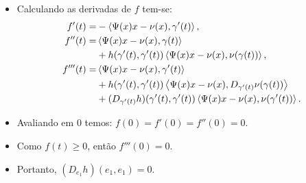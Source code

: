 \documentclass[10pt,a4paper]{beamer}
\theoremstyle{definition}
\begin{document}
\begin{frame}

	\begin{itemize}

		\item Calculando as derivadas de $f$ tem-se:
		\begin{align*}
		f'(t) =& -\left\langle \Psi(x)x - \nu(x),\gamma'(t) \right\rangle,\\
		f''(t) =& \left\langle \Psi(x)x - \nu(x),\gamma(t) \right\rangle\\
		& + h(\gamma'(t),\gamma'(t)) \left\langle \Psi(x)x - \nu(x),\nu(\gamma(t)) \right\rangle,\\
		f'''(t) =& \left\langle \Psi(x)x - \nu(x),\gamma'(t) \right\rangle\\
		& + h(\gamma'(t),\gamma'(t)) \left\langle \Psi(x)x - \nu(x),D_{\gamma'(t)} \nu(\gamma(t)) \right\rangle\\
		& + (D_{\gamma'(t)} h) (\gamma'(t),\gamma'(t)) \left\langle \Psi(x)x - \nu(x),\nu(\gamma'(t)) \right\rangle.
		\end{align*}
	
		\pause
		
		\item Avaliando em $0$ temos: $f(0)=f'(0)=f''(0)=0$.
		
		\pause
		
		\item Como $f(t) \geq 0$, então $f'''(0)=0$.
		
		\pause
		
		\item Portanto, $(D_{e_1}h)(e_1,e_1)=0$.
		
	\end{itemize}

\end{frame}
\end{document}
